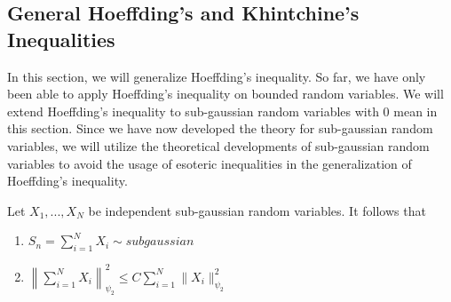 

\subsection{General Hoeffding's and Khintchine's Inequalities}
In this section, we will generalize Hoeffding's inequality. So far, we have only been able to apply Hoeffding's inequality on bounded random variables. We will extend Hoeffding's inequality to sub-gaussian random variables with 0 mean in this section. Since we have now developed the theory for sub-gaussian random variables, we will utilize the theoretical developments of sub-gaussian random variables to avoid the usage of esoteric inequalities in the generalization of Hoeffding's inequality. \\

\begin{tcolorbox}
\begin{proposition}
Let $X_1, ..., X_N$ be independent sub-gaussian random variables. It follows that 
\begin{enumerate}
    \item $\displaystyle{S_n = \sum_{i=1}^{N} X_i \sim subgaussian}$
    \item $\displaystyle{\left\|\sum_{i=1}^{N}X_i \right\|_{\psi_2}^2 \leq C \sum_{i=1}^{N}\|X_i\|^2_{\psi_2} }$
\end{enumerate}
\label{prop:subg_sum}
\end{proposition}
\end{tcolorbox}

